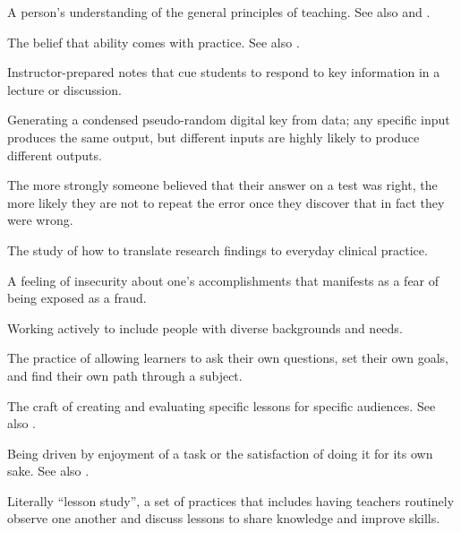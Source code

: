 \begin{description}
 A
person's understanding of the general principles of teaching. See also
and .

 The belief that ability comes with
practice. See also .

 Instructor-prepared notes that cue
students to respond to key information in a lecture or discussion.

 Generating a condensed pseudo-random digital key
from data; any specific input produces the same output, but different inputs are
highly likely to produce different outputs.

 The more strongly someone
believed that their answer on a test was right, the more likely they are not to
repeat the error once they discover that in fact they were wrong.

 The study of how to
translate research findings to everyday clinical practice.

 A feeling of insecurity about
one's accomplishments that manifests as a fear of being exposed as a fraud.

 Working actively to include people with
diverse backgrounds and needs.

 The practice of
allowing learners to ask their own questions, set their own goals, and find
their own path through a subject.

 The craft of creating and
evaluating specific lessons for specific audiences. See also
.

 Being driven by enjoyment
of a task or the satisfaction of doing it for its own sake.  See also
.

 Literally ``lesson study'', a set of
practices that includes having teachers routinely observe one another and
discuss lessons to share knowledge and improve skills.


\end{description}
